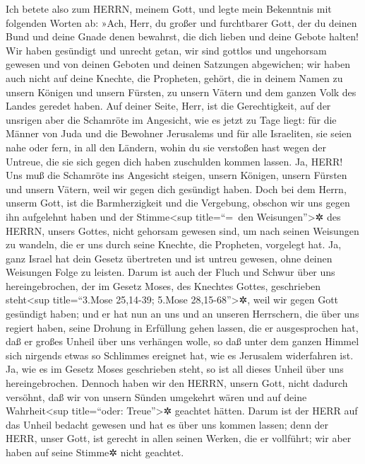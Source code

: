 Ich betete also zum HERRN, meinem Gott, und legte mein
Bekenntnis mit folgenden Worten ab: »Ach, Herr, du großer und
furchtbarer Gott, der du deinen Bund und deine Gnade denen bewahrst, die
dich lieben und deine Gebote halten! Wir haben gesündigt
und unrecht getan, wir sind gottlos und ungehorsam gewesen und von
deinen Geboten und deinen Satzungen abgewichen; wir haben
auch nicht auf deine Knechte, die Propheten, gehört, die in deinem Namen
zu unsern Königen und unsern Fürsten, zu unsern Vätern und dem ganzen
Volk des Landes geredet haben. Auf deiner Seite, Herr, ist
die Gerechtigkeit, auf der unsrigen aber die Schamröte im Angesicht, wie
es jetzt zu Tage liegt: für die Männer von Juda und die Bewohner
Jerusalems und für alle Israeliten, sie seien nahe oder fern, in all den
Ländern, wohin du sie verstoßen hast wegen der Untreue, die sie sich
gegen dich haben zuschulden kommen lassen. Ja, HERR! Uns
muß die Schamröte ins Angesicht steigen, unsern Königen, unsern Fürsten
und unsern Vätern, weil wir gegen dich gesündigt haben.
Doch bei dem Herrn, unserm Gott, ist die Barmherzigkeit
und die Vergebung, obschon wir uns gegen ihn aufgelehnt haben
und der Stimme\textless sup title=``=~den
Weisungen''\textgreater✲ des HERRN, unsers Gottes, nicht gehorsam
gewesen sind, um nach seinen Weisungen zu wandeln, die er uns durch
seine Knechte, die Propheten, vorgelegt hat. Ja, ganz
Israel hat dein Gesetz übertreten und ist untreu gewesen, ohne deinen
Weisungen Folge zu leisten. Darum ist auch der Fluch und Schwur über uns
hereingebrochen, der im Gesetz Moses, des Knechtes Gottes, geschrieben
steht\textless sup title=``3.Mose 25,14-39; 5.Mose
28,15-68''\textgreater✲, weil wir gegen Gott gesündigt haben;
und er hat nun an uns und an unseren Herrschern, die über
uns regiert haben, seine Drohung in Erfüllung gehen lassen, die er
ausgesprochen hat, daß er großes Unheil über uns verhängen wolle, so daß
unter dem ganzen Himmel sich nirgends etwas so Schlimmes ereignet hat,
wie es Jerusalem widerfahren ist. Ja, wie es im Gesetz
Moses geschrieben steht, so ist all dieses Unheil über uns
hereingebrochen. Dennoch haben wir den HERRN, unsern Gott, nicht dadurch
versöhnt, daß wir von unsern Sünden umgekehrt wären und auf deine
Wahrheit\textless sup title=``oder: Treue''\textgreater✲ geachtet
hätten. Darum ist der HERR auf das Unheil bedacht gewesen
und hat es über uns kommen lassen; denn der HERR, unser Gott, ist
gerecht in allen seinen Werken, die er vollführt; wir aber haben auf
seine Stimme✲ nicht geachtet.

